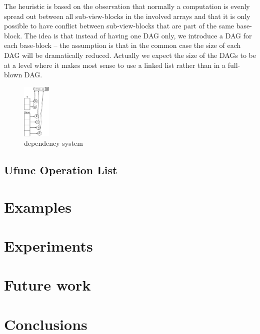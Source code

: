 \documentclass[preprint]{../PGAS10/sigplanconf}
\begin{document}
The heuristic is based on the observation that normally a computation is evenly spread out between all sub-view-blocks in the involved arrays and that it is only possible to have conflict between sub-view-blocks that are part of the same base-block. The idea is that instead of having one DAG only, we introduce a DAG for each base-block -- the assumption is that in the common case the size of each DAG will be dramatically reduced. Actually we expect the size of the DAGs to be at a level where it makes most sense to use a linked list rather than in a full-blown DAG.


\begin{figure}
 \centering
 \includegraphics[width=50px]{gfx/dependency_system}
 \caption{dependency system}
 \label{fig:dependency_system}
\end{figure}











\subsection{Ufunc Operation List}




\section{Examples}


\section{Experiments}


\section{Future work}


\section{Conclusions}




\end{document}
